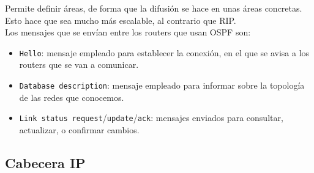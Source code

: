 Permite definir áreas, de forma que la difusión se hace en unas áreas concretas. Esto hace que sea mucho más escalable, al contrario que \acrshort{RIP}.\\

\noindent
Los mensajes que se envían entre los routers que usan \acrshort{OSPF} son:
\begin{itemize}
    \item \verb|Hello|: mensaje empleado para establecer la conexión, en el que se avisa a los routers que se van a comunicar.
    \item \verb|Database description|: mensaje empleado para informar sobre la topología de las redes que conocemos. 
    \item \verb|Link status request|/\verb|update|/\verb|ack|: mensajes enviados para consultar, actualizar, o confirmar cambios.
\end{itemize}


\subsection{Cabecera \acrshort{IP}}

